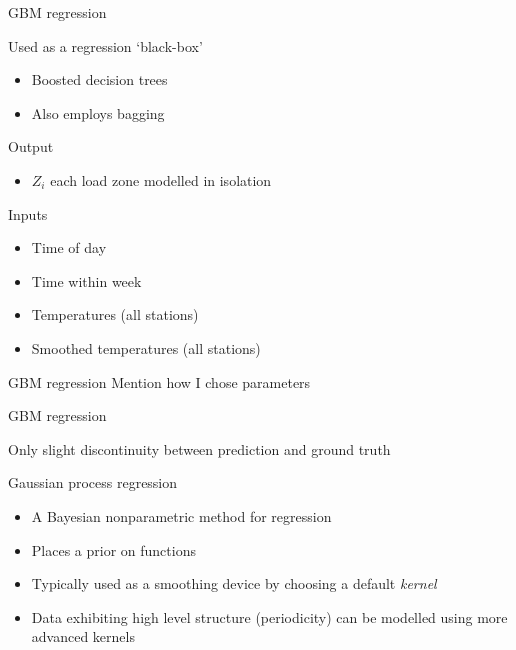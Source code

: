 \begin{frame}{GBM regression}
  \begin{block}{Used as a regression `black-box'}
    \begin{itemize}
      \item Boosted decision trees
      \item Also employs bagging
    \end{itemize}
  \end{block}
  \begin{block}{Output}
  	\begin{itemize}
      \item $Z_i$ \ie each load zone modelled in isolation
    \end{itemize}
  \end{block}
  \begin{block}{Inputs}
    \begin{itemize}
      \item Time of day
      \item Time within week
      \item Temperatures (all stations)
      \item Smoothed temperatures (all stations)
    \end{itemize}
  \end{block}
\end{frame}

\begin{frame}{GBM regression}
  Mention how I chose parameters
\end{frame}

\begin{frame}{GBM regression}
  \begin{centering}
    
    Only slight discontinuity between prediction and ground truth
  \end{centering}
\end{frame}

\begin{frame}{Gaussian process regression}
  \begin{itemize}
    \item A Bayesian nonparametric method for regression
    \vspace{\baselineskip}
    \item Places a prior on functions
    \vspace{\baselineskip}
    \item Typically used as a smoothing device by choosing a default \emph{kernel}
    \vspace{\baselineskip}
    \item Data exhibiting high level structure (\eg periodicity) can be modelled using more advanced kernels
  \end{itemize}
\end{frame}

